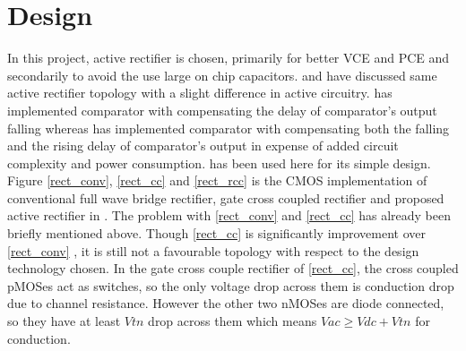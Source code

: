 \documentclass[12pt,a4paper,UKenglish]{report}
\begin{document}
\section{Design}	%

In this project, active rectifier is chosen, primarily for better VCE and PCE and secondarily to avoid the use large on chip capacitors. \cite{rectrcc}  and \cite{rectcomp} have discussed same active rectifier topology with a slight difference in active circuitry. \cite{rectrcc} has implemented comparator with compensating the delay of comparator's output falling whereas \cite{rectcomp} has implemented comparator with compensating both the falling and the rising delay of comparator's output in expense of added circuit complexity and power consumption. \cite{rectrcc} has been used here for its simple design. \\

Figure \ref{rect_conv}, \ref{rect_cc} and \ref{rect_rcc} is the CMOS implementation of conventional full wave bridge rectifier, gate cross coupled rectifier and proposed active rectifier in \cite{rectrcc}. The problem with \ref{rect_conv} and \ref{rect_cc} has already been briefly mentioned above. Though  \ref{rect_cc}  is significantly improvement over  \ref{rect_conv} , it is still not a favourable topology with respect to the design technology chosen. In the gate cross couple rectifier of  \ref{rect_cc}, the cross coupled pMOSes act as switches, so the only voltage drop across them is conduction drop due to channel resistance. However the other two nMOSes are diode connected, so they have at least $Vtn$ drop across them which means $Vac \geq Vdc + Vtn$ for conduction. \\
\end{document}
